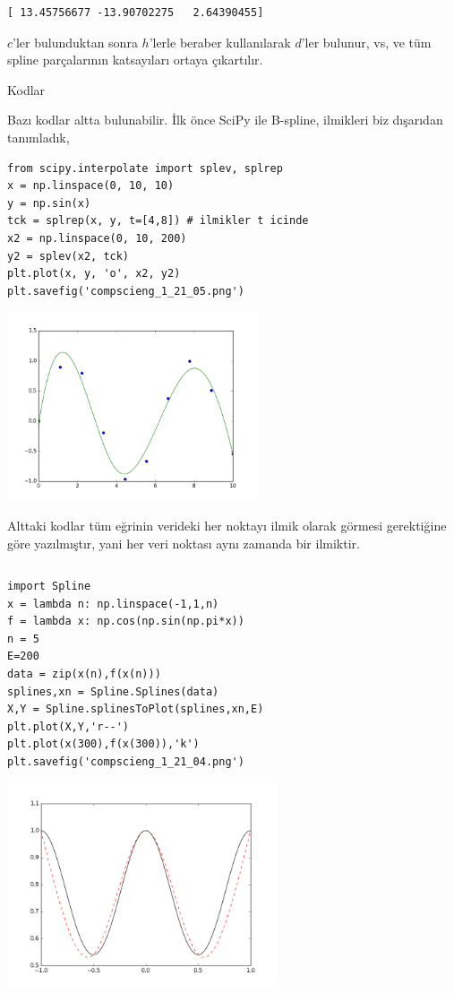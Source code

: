 \documentclass[12pt,fleqn]{article}\usepackage{../../common}
\begin{document}
\begin{verbatim}
[ 13.45756677 -13.90702275   2.64390455]
\end{verbatim}

$c$'ler bulunduktan sonra $h$'lerle beraber kullanılarak $d$'ler bulunur,
vs, ve tüm spline parçalarının katsayıları ortaya çıkartılır.

Kodlar

Bazı kodlar altta bulunabilir. İlk önce SciPy ile B-spline, ilmikleri biz
dışarıdan tanımladık, 

\begin{verbatim}
from scipy.interpolate import splev, splrep
x = np.linspace(0, 10, 10)
y = np.sin(x)
tck = splrep(x, y, t=[4,8]) # ilmikler t icinde
x2 = np.linspace(0, 10, 200)
y2 = splev(x2, tck)
plt.plot(x, y, 'o', x2, y2)
plt.savefig('compscieng_1_21_05.png')
\end{verbatim}

\includegraphics[width=20em]{compscieng_1_21_05.png}

Alttaki kodlar tüm eğrinin verideki her noktayı ilmik olarak görmesi
gerektiğine göre yazılmıştır, yani her veri noktası aynı zamanda bir
ilmiktir.

\inputminted[fontsize=\footnotesize]{python}{Spline.py}

\begin{verbatim}
import Spline
x = lambda n: np.linspace(-1,1,n)
f = lambda x: np.cos(np.sin(np.pi*x))
n = 5
E=200
data = zip(x(n),f(x(n)))
splines,xn = Spline.Splines(data)
X,Y = Spline.splinesToPlot(splines,xn,E)
plt.plot(X,Y,'r--')
plt.plot(x(300),f(x(300)),'k')
plt.savefig('compscieng_1_21_04.png')
\end{verbatim}

\includegraphics[height=6cm]{compscieng_1_21_04.png}
\end{document}
